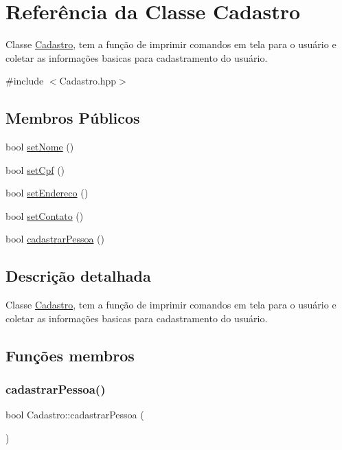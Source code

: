 \hypertarget{class_cadastro}{}\section{Referência da Classe Cadastro}
\label{class_cadastro}


Classe \mbox{\hyperlink{class_cadastro}{Cadastro}}, tem a função de imprimir comandos em tela para o usuário e coletar as informações basicas para cadastramento do usuário.  




{\ttfamily \#include $<$Cadastro.\+hpp$>$}

\subsection*{Membros Públicos}
\begin{DoxyCompactItemize}
\item 
bool \mbox{\hyperlink{class_cadastro_ae916b7e08d054728d38ea850d6912031}{set\+Nome}} ()
\item 
bool \mbox{\hyperlink{class_cadastro_a756e3c3377e7a2aa7b539ed230dce36c}{set\+Cpf}} ()
\item 
bool \mbox{\hyperlink{class_cadastro_a3f36331c5294ce2fc5e86e071fea9fc5}{set\+Endereco}} ()
\item 
bool \mbox{\hyperlink{class_cadastro_ad177bb36ac413de510c780fbeafc4001}{set\+Contato}} ()
\item 
bool \mbox{\hyperlink{class_cadastro_a7388c0d4275b2398c8245293af947f8a}{cadastrar\+Pessoa}} ()
\end{DoxyCompactItemize}


\subsection{Descrição detalhada}
Classe \mbox{\hyperlink{class_cadastro}{Cadastro}}, tem a função de imprimir comandos em tela para o usuário e coletar as informações basicas para cadastramento do usuário. 

\subsection{Funções membros}
\mbox{\label{class_cadastro_a7388c0d4275b2398c8245293af947f8a}} 
\subsubsection{\texorpdfstring{cadastrarPessoa()}{cadastrarPessoa()}}
{\footnotesize\ttfamily bool Cadastro\+::cadastrar\+Pessoa (\begin{DoxyParamCaption}{ }\end{DoxyParamCaption})}


